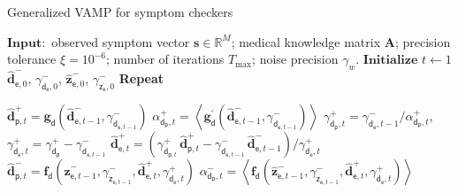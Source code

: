 \begin{algorithm}[h!]
   \caption{\small{Generalized VAMP for symptom checkers}}
   \label{alg:vamp-algorithm}
\begin{algorithmic}[1]
\fontsize{7.2}{7.2}\selectfont
\Statex $\mathbf{Input:}$ observed symptom vector $\boldsymbol{s} \in\mathbb{R}^{M}$; medical knowledge matrix $\mathbf{A}$; precision tolerance $\xi=10^{-6}$; number of iterations $T_\textrm{max}$; noise precision $\gamma_w$. %
\State $\mathbf{Initialize}$ 
\Statex $t\gets 1$
\Statex{}
\Statex $\boldsymbol{\widehat{d}}^{-}_{\mathsf{e},0}$, $\gamma_{\bm{\mathsf{d}}_{\mathsf{e}},0}^-$,
$\boldsymbol{\widehat{z}}^{-}_{\mathsf{e},0}$, $\gamma_{\bm{\mathsf{z}}_{\mathsf{e}},0}^-$\vspace{0.1cm}
\State \textbf{Repeat}\vspace{0.1cm}
\Statex \par {}
\StateOrange $\widehat{\bm{d}}_{\mathsf{p}, t}^+=\bm{g}_{\bm{\mathsf{d}}}\left(\mathbf{\widehat{d}}^-_{\mathsf{e},t-1}, \gamma_{\bm{\mathsf{d}}_{\mathsf{e}, t-1}}^-\right)$\label{algo:denoising1-d}
\StateOrange $\alpha_{\bm{\mathsf{d}}_\mathsf{p}, t}^+=\left\langle \bm{g}_{\bm{\mathsf{d}}}^{\prime}\left(\mathbf{\widehat{d}}^-_{\mathsf{e},t-1}, \gamma_{\bm{\mathsf{d}}_{\mathsf{e}, t-1}}^-\right)\right\rangle$
\StateOrange $\gamma_{\bm{\mathsf{d}}_{\mathsf{p}}, t}^+=\gamma_{\bm{\mathsf{d}}_{\mathsf{e}},t-1}^- / \alpha_{\bm{\mathsf{d}}_\mathsf{p}, t}^+$, \quad$\gamma_{\bm{\mathsf{d}}_{\mathsf{e}},t}^+=\gamma_{\bm{\mathsf{d}}_{\mathsf{p}}}^+-\gamma_{\bm{\mathsf{d}}_{\mathsf{e}, t-1}}^-$
\StateOrange $\mathbf{\widehat{d}}^+_{\mathsf{e}, t}=\left(\gamma_{\bm{\mathsf{d}}_{\mathsf{p},t}}^+\, \widehat{\bm{d}}_{\mathsf{p}, t}^+-\gamma_{\bm{\mathsf{d}}_{\mathsf{e}, t-1}}^-\, \mathbf{\widehat{d}}^-_{\mathsf{e},t-1}\right) / \gamma_{\bm{\mathsf{d}}_{\mathsf{e}},t}^+$
\StateBlue $\widehat{\bm{d}}_{\mathsf{p}, t}^-=\bm{f}_{\bm{\mathsf{d}}}\left(\mathbf{\widehat{z}}^-_{\mathsf{e},t-1}, \gamma_{\bm{\mathsf{z}}_{\mathsf{e}, t-1}}^-, \mathbf{\widehat{d}}^+_{\mathsf{e}, t}, \gamma_{\bm{\mathsf{d}}_{\mathsf{e}},t}^+\right)$
\StateBlue $\alpha_{\bm{\mathsf{d}}_\mathsf{p}, t}^-=\left\langle \bm{f}_{\bm{\mathsf{d}}}\left(\mathbf{\widehat{z}}^-_{\mathsf{e},t-1}, \gamma_{\bm{\mathsf{z}}_{\mathsf{e}, t-1}}^-, \mathbf{\widehat{d}}^+_{\mathsf{e}, t}, \gamma_{\bm{\mathsf{d}}_{\mathsf{e}},t}^+\right)\right\rangle$

\end{algorithmic}
\end{algorithm}
